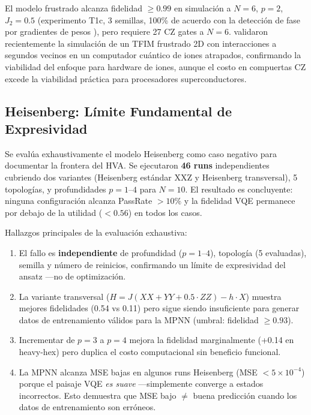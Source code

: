 \documentclass[11pt,a4paper,spanish]{book}
\begin{document}
El modelo frustrado alcanza fidelidad $\geq 0.99$ en simulación a $N = 6$, $p = 2$, $J_2 = 0.5$ (experimento T1c, 3 semillas, 100\% de acuerdo con la detección de fase por gradientes de pesos \citep{hernandes2025}), pero requiere 27 CZ gates a $N = 6$. \citet{teoh2025} validaron recientemente la simulación de un TFIM frustrado 2D con interacciones a segundos vecinos en un computador cuántico de iones atrapados, confirmando la viabilidad del enfoque para hardware de iones, aunque el costo en compuertas CZ excede la viabilidad práctica para procesadores superconductores.

\subsection{Heisenberg: Límite Fundamental de Expresividad}

Se evalúa exhaustivamente el modelo Heisenberg como caso negativo para documentar la frontera del HVA. Se ejecutaron \textbf{46 runs} independientes cubriendo dos variantes (Heisenberg estándar XXZ y Heisenberg transversal), 5 topologías, y profundidades $p = 1$--$4$ para $N = 10$. El resultado es concluyente: ninguna configuración alcanza PassRate $> 10\%$ y la fidelidad VQE permanece por debajo de la utilidad ($< 0.56$) en todos los casos.



Hallazgos principales de la evaluación exhaustiva:

\begin{enumerate}
    \item El fallo es \textbf{independiente} de profundidad ($p = 1$--$4$), topología (5 evaluadas), semilla y número de reinicios, confirmando un límite de expresividad del ansatz ---no de optimización.
    \item La variante transversal ($H = J(XX + YY + 0.5 \cdot ZZ) - h \cdot X$) muestra mejores fidelidades (0.54 vs 0.11) pero sigue siendo insuficiente para generar datos de entrenamiento válidos para la MPNN (umbral: fidelidad $\geq 0.93$).
    \item Incrementar de $p = 3$ a $p = 4$ mejora la fidelidad marginalmente (+0.14 en heavy-hex) pero duplica el costo computacional sin beneficio funcional.
    \item La MPNN alcanza MSE bajas en algunos runs Heisenberg (MSE $< 5 \times 10^{-4}$) porque el paisaje VQE \emph{es suave} ---simplemente converge a estados incorrectos. Esto demuestra que MSE bajo $\neq$ buena predicción cuando los datos de entrenamiento son erróneos.
\end{enumerate}
\end{document}
